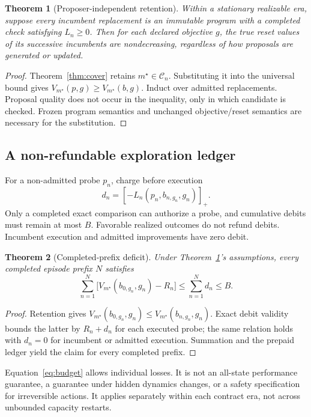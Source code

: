 \documentclass[10pt,twocolumn]{article}
\newtheorem{theorem}{Theorem}
\newcommand{\C}{\mathcal C}
\newcommand{\clip}[1]{[#1]_+}
\begin{document}
\begin{theorem}[Proposer-independent retention]\label{thm:retention}
Within a stationary realizable era, suppose every incumbent replacement is an
immutable program with a completed check satisfying $L_n\geq0$. Then for each
declared objective $g$, the true reset values of its successive incumbents are
nondecreasing, regardless of how proposals are generated or updated.
\end{theorem}
\begin{proof}
Theorem~\ref{thm:cover} retains $m^\star\in\C_n$. Substituting it into the
universal bound gives $V_{m^\star}(p,g)\geq V_{m^\star}(b,g)$.
Induct over admitted replacements. Proposal quality does not occur in the
inequality, only in which candidate is checked. Frozen program semantics and
unchanged objective/reset semantics are necessary for the substitution.
\end{proof}

\subsection{A non-refundable exploration ledger}
For a non-admitted probe $p_n$, charge before execution
\begin{equation}
 d_n=\clip{-L_n(p_n,b_{n,g_n},g_n)}.
\end{equation}
Only a completed exact comparison can authorize a probe, and cumulative debits
must remain at most $B$. Favorable realized outcomes do not refund debits.
Incumbent execution and admitted improvements have zero debit.

\begin{theorem}[Completed-prefix deficit]\label{thm:budget}
Under Theorem~\ref{thm:retention}'s assumptions, every completed episode prefix
$N$ satisfies
\begin{equation}
 \sum_{n=1}^{N}\big[V_{m^\star}(b_{0,g_n},g_n)-R_n\big]
 \leq \sum_{n=1}^{N}d_n\leq B.\label{eq:budget}
\end{equation}
\end{theorem}
\begin{proof}
Retention gives $V_{m^\star}(b_{0,g_n},g_n)\leq
V_{m^\star}(b_{n,g_n},g_n)$. Exact debit validity bounds the latter by
$R_n+d_n$ for each executed probe; the same relation holds with $d_n=0$ for
incumbent or admitted execution. Summation and the prepaid ledger yield the
claim for every completed prefix.
\end{proof}

Equation~\eqref{eq:budget} allows individual losses. It is not an all-state
performance guarantee, a guarantee under hidden dynamics changes, or a safety
specification for irreversible actions. It applies separately within each
contract era, not across unbounded capacity restarts.
\end{document}
